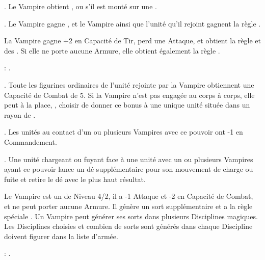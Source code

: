  \textbf{\bloodlinepower}. Le Vampire obtient , ou  s'il est monté sur une \largetarget{}.

 \textbf{\bloodlinepower}. Le Vampire gagne \awaken{\zombies, \direwolves, \batswarms, \greatbats}, et le Vampire ainsi que l'unité qu'il rejoint gagnent la règle \swiftstride{}.

\endpricelist


\noindent\parbox{\columnwidth}{
La Vampire gagne +2 en Capacité de Tir, perd une Attaque, et obtient la règle \lightningreflexes{} et des \throwingweapons{}. Si elle ne porte aucune Armure, elle obtient également la règle \distracting{}.

\bloodties{}: \courtofthedamned{}.
}

\startpricelist

 \textbf{\ancientbloodpower}. Toute les figurines ordinaires de l'unité rejointe par la Vampire obtiennent une Capacité de Combat de 5. Si la Vampire n'est pas engagée au corps à corps, elle peut à la place, , choisir de donner ce bonus à une unique unité située dans un rayon de .

 \textbf{\bloodlinepower}. Les unités au contact d'un ou plusieurs Vampires avec ce pouvoir ont -1 en Commandement.

 \textbf{\bloodlinepower}. Une unité chargeant ou fuyant face à une unité avec un ou plusieurs Vampires ayant ce pouvoir lance un dé supplémentaire pour son mouvement de charge ou fuite et retire le dé avec le plus haut résultat.

\endpricelist


\noindent\parbox{\columnwidth}{
Le Vampire est un \wizard{} de Niveau 4/2, il a -1 Attaque et -2 en Capacité de Combat, et ne peut porter aucune Armure. Il génère un sort supplémentaire et a la règle spéciale \awaken{\zombies, \skeletons}. Un Vampire \nosferatu{} peut générer ses sorts dans plusieurs Disciplines magiques. Les Disciplines choisies et combien de sorts sont générés dans chaque Discipline doivent figurer dans la liste d'armée.

\bloodties{}: \wraiths{}.
}

